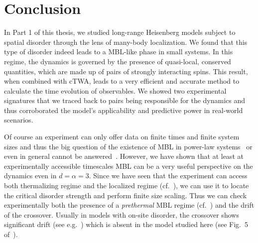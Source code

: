 \chapter{Conclusion}\label{ch:discussion-pair-localization}
In Part 1 of this thesis, we studied long-range Heisenberg models subject to spatial disorder through the lens of many-body localization. We found that this type of disorder indeed leads to a MBL-like phase in small systems. In this regime, the dynamics is governed by the presence of quasi-local, conserved quantities, which are made up of pairs of strongly interacting spins. This result, when combined with cTWA, leads to a very efficient and accurate method to calculate the time evolution of observables. We showed two experimental signatures that we traced back to pairs being responsible for the dynamics and thus corroborated the model's applicability and predictive power in real-world scenarios.

Of course an experiment can only offer data on finite times and finite system sizes and thus the big question of the existence of MBL in power-law systems~\cite{yaoManyBodyLocalizationDipolar2014,burinLocalizationRandomXY2015,burinManybodyDelocalizationStrongly2015,nandkishoreManyBodyLocalized2017} or even in general cannot be answered~\cite{deroeckStabilityInstabilityDelocalization2017,morningstarAvalanchesManybodyResonances2022,longPhenomenologyPrethermalManyBody2023,scoccoThermalizationPropagationFront2024}. However, we have shown that at least at experimentally accessible timescales MBL can be a very useful perspective on the dynamics even in $d=\alpha=3$. Since we have seen that the experiment can access both thermalizing regime and the localized regime (cf.~\cite{franzEmergentPairLocalization2022}), we can use it to locate the critical disorder strength and perform finite size scaling. Thus we can check experimentally both the presence of a \emph{prethermal} MBL regime (cf.~\cite{longPhenomenologyPrethermalManyBody2023}) and the drift of the crossover. Usually in models with on-site disorder, the crossover shows significant drift (see e.g.~\cite{luitzManybodyLocalizationEdge2015}) which is absent in the model studied here (see Fig.~5 of~\cite{braemerPairLocalizationDipolar2022}).  

